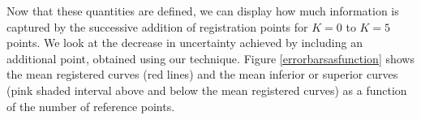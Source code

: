 Now that these quantities are defined, we can display how much information is captured by the successive addition of registration points for $K=0$ to $K=5$ points. We look at the decrease in uncertainty achieved by including an additional point, obtained using our technique. Figure \ref{errorbarsasfunction} shows the mean registered curves (red lines) and the mean inferior or superior curves (pink shaded interval above and below the mean registered curves) as a function of the number of reference points. \\

\begin{figure}[!ht]
\begin{center}
 \\
\end{center}
\end{figure}
